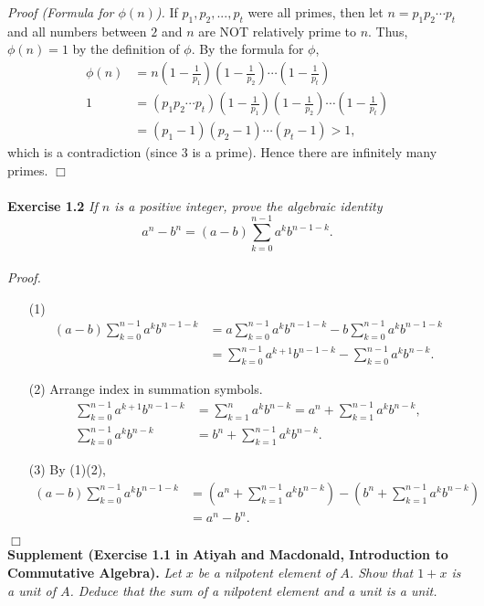 \documentclass{article}
\begin{document}
\emph{Proof (Formula for $\phi(n)$).}
If
$p_1, p_2, ..., p_t$ were all primes, then let
$n = p_1 p_2 \cdots p_t$ and all numbers between $2$ and $n$ are
NOT relatively prime to $n$.
Thus, $\phi(n) = 1$ by the definition of $\phi$.
By the formula for $\phi$,
\begin{align*}
\phi(n)
&= n
\left( 1 - \frac{1}{p_1} \right)
\left( 1 - \frac{1}{p_2} \right)
\cdots
\left( 1 - \frac{1}{p_t} \right) \\
1
&= (p_1 p_2 \cdots p_t)
\left( 1 - \frac{1}{p_1} \right)
\left( 1 - \frac{1}{p_2} \right)
\cdots
\left( 1 - \frac{1}{p_t} \right) \\
&= (p_1 - 1)(p_2 - 1) \cdots (p_t - 1) > 1,
\end{align*}
which is a contradiction (since $3$ is a prime).
Hence there are infinitely many primes.
$\Box$ \\\\


\textbf{Exercise 1.2}
\emph{If $n$ is a positive integer, prove the algebraic identity
$$a^n - b^n = (a - b) \sum_{k=0}^{n-1} a^k b^{n-1-k}.$$} \\

\emph{Proof.}
\begin{enumerate}
\item[(1)]
\begin{align*}
(a - b) \sum_{k=0}^{n-1} a^k b^{n-1-k}
&= a \sum_{k=0}^{n-1} a^k b^{n-1-k} - b \sum_{k=0}^{n-1} a^k b^{n-1-k} \\
&= \sum_{k=0}^{n-1} a^{k+1} b^{n-1-k} - \sum_{k=0}^{n-1} a^k b^{n-k}.
\end{align*}
\item[(2)] Arrange index in summation symbols.
\begin{align*}
\sum_{k=0}^{n-1} a^{k+1} b^{n-1-k}
&= \sum_{k=1}^{n} a^{k} b^{n-k}
= a^n + \sum_{k=1}^{n-1} a^{k} b^{n-k}, \\
\sum_{k=0}^{n-1} a^k b^{n-k}
&= b^n + \sum_{k=1}^{n-1} a^{k} b^{n-k}.
\end{align*}
\item[(3)]
By (1)(2),
\begin{align*}
(a - b) \sum_{k=0}^{n-1} a^k b^{n-1-k}
&= \left( a^n + \sum_{k=1}^{n-1} a^{k} b^{n-k} \right)
- \left( b^n + \sum_{k=1}^{n-1} a^{k} b^{n-k} \right) \\
&= a^n - b^n.
\end{align*}
\end{enumerate}
$\Box$ \\

\textbf{Supplement (Exercise 1.1 in Atiyah and Macdonald,
Introduction to Commutative Algebra).}
\emph{Let $x$ be a nilpotent element of $A$.
Show that $1+x$ is a unit of $A$.
Deduce that the sum of a nilpotent element and a unit is a unit.} \\
\end{document}
